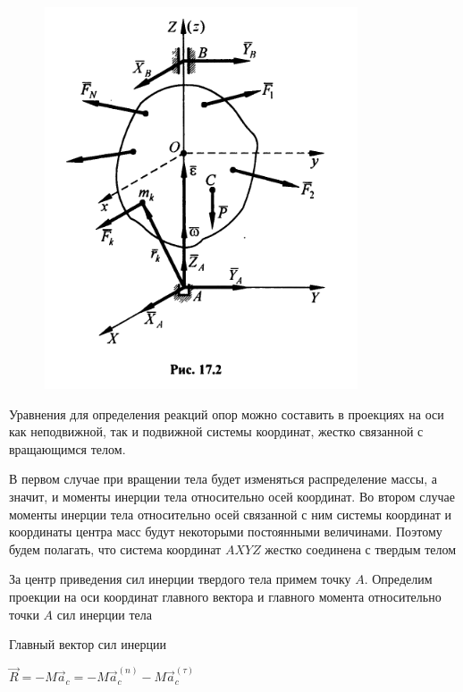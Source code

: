 {\begin{center}
    \par \begin{figure}[H]
        \centering \includegraphics[scale = 0.5]{img/17.2.jpeg}
        \end{figure}
    
    \par Уравнения для определения реакций опор можно составить в проекциях  на  оси  как  неподвижной,  так  и  подвижной  системы  координат,  жестко связанной с вращающимся телом. 
    
    \par В первом случае при вращении тела будет изменяться распределение массы,  а значит, и моменты инерции тела относительно осей координат. Во втором случае моменты инерции тела относительно осей связанной с ним системы координат и координаты центра масс будут некоторыми постоянными величинами. Поэтому будем  полагать, что система координат $AXYZ$ жестко соединена с твердым телом
    
    \par За центр приведения сил инерции твердого тела примем точку $A$. Определим проекции на оси координат главного вектора и главного момента относительно точки $A$ сил инерции тела
    
    \par Главный вектор сил инерции
    
    \par $\vec{R} = -M \vec{a}_c = -M \vec{a}_c^{(n)} - M \vec{a}_c^{(\tau)}$
    

\end{center}}
